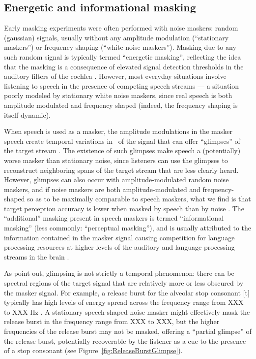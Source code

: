 \subsection{Energetic and informational masking}
Early masking experiments \citep[e.g.,][]{HawkinsStevens1950,Tolhurst1957b,PollackPickett1958} were often performed with noise maskers: random (gaussian) signals, usually without any amplitude modulation (“stationary maskers”) or frequency shaping (“white noise maskers”).  Masking due to any such random signal is typically termed “energetic masking”, reflecting the idea that the masking is a consequence of elevated signal detection thresholds in the auditory filters of the cochlea \citep{DurlachEtAl2003,xxx}.  However, most everyday situations involve listening to speech in the presence of competing speech streams — a situation poorly modeled by stationary white noise maskers, since real speech is both amplitude modulated and frequency shaped (indeed, the frequency shaping is itself dynamic).  

When speech is used as a masker, the amplitude modulations in the masker speech create temporal variations in \snr\ of the signal that can offer “glimpses” of the target stream \citep{FestenPlomp1990}.  The existence of such glimpses make speech a (potentially) worse masker than stationary noise, since listeners can use the glimpses to reconstruct neighboring spans of the target stream that are less clearly heard.\footnotemark{}  However, glimpses can also occur with amplitude-modulated random noise maskers, and if noise maskers are both amplitude-modulated and frequency-shaped so as to be maximally comparable to speech maskers, what we find is that target perception accuracy is lower when masked by speech than by noise \citep[e.g.,][]{CarhartEtAl1969,LewisEtAl1988,SimpsonCooke2005}.  The “additional” masking present in speech maskers is termed “informational masking” (less commonly: “perceptual masking”), and is usually attributed to the information contained in the masker signal causing competition for language processing resources at higher levels of the auditory and language processing streams in the brain \citep{DurlachEtAl2003,xxx}.

As \citet{xxx} point out, glimpsing is not strictly a temporal phenomenon: there can be spectral regions of the target signal that are relatively more or less obscured by the masker signal.  For example, a release burst for the alveolar stop consonant [t] typically has high levels of energy spread across the frequency range from XXX to XXX Hz \citep{xxx}.  A stationary speech-shaped noise masker might effectively mask the release burst in the frequency range from XXX to XXX, but the higher frequencies of the release burst may not be masked, offering a “partial glimpse” of the release burst, potentially recoverable by the listener as a cue to the presence of a stop consonant (see Figure~\ref{fig:ReleaseBurstGlimpse}).

